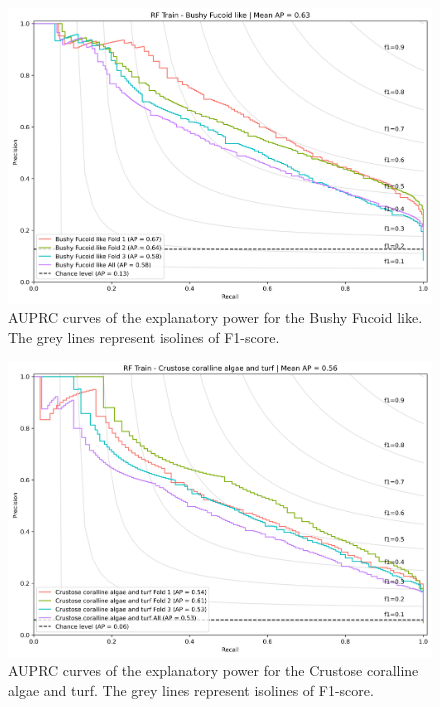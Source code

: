 \begin{figure}
\hypertarget{fig:chap3figS24}{%
\centering
\includegraphics{03-Chapitre3/figures/supplementary/03-precision_recall_curve_train_rf_Bushy Fucoid like.png}
\caption{AUPRC curves of the explanatory power for the Bushy Fucoid
like. The grey lines represent isolines of
F1-score.}\label{fig:chap3figS24}
}
\end{figure}

\begin{figure}
\hypertarget{fig:chap3figS25}{%
\centering
\includegraphics{03-Chapitre3/figures/supplementary/03-precision_recall_curve_train_rf_Crustose coralline algae and turf.png}
\caption{AUPRC curves of the explanatory power for the Crustose
coralline algae and turf. The grey lines represent isolines of
F1-score.}\label{fig:chap3figS25}
}
\end{figure}

